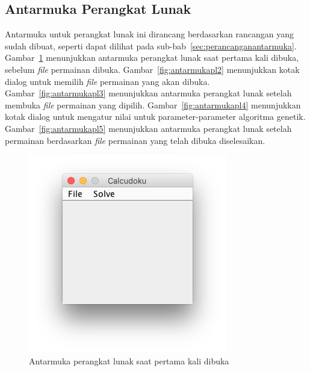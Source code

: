 \subsection{Antarmuka Perangkat Lunak}
\label{sec:antarmukapl}

Antarmuka untuk perangkat lunak ini dirancang berdasarkan rancangan yang sudah dibuat, seperti dapat dilihat pada sub-bab~\ref{sec:perancanganantarmuka}. Gambar~\ref{fig:antarmukapl1} menunjukkan antarmuka perangkat lunak saat pertama kali dibuka, sebelum \textit{file} permainan dibuka. Gambar~\ref{fig:antarmukapl2} menunjukkan kotak dialog untuk memilih \textit{file} permainan yang akan dibuka. Gambar~\ref{fig:antarmukapl3} menunjukkan antarmuka perangkat lunak setelah membuka \textit{file} permainan yang dipilih. Gambar~\ref{fig:antarmukapl4} menunjukkan kotak dialog untuk mengatur nilai untuk parameter-parameter algoritma genetik. Gambar~\ref{fig:antarmukapl5} menunjukkan antarmuka perangkat lunak setelah permainan berdasarkan \textit{file} permainan yang telah dibuka diselesaikan.

\begin{figure}
\centering
\captionsetup{justification=centering}
\includegraphics[scale=1]{Gambar/ImplementasiPengujian/Calcudoku1.png}
\caption[Antarmuka perangkat lunak saat pertama kali dibuka]{Antarmuka perangkat lunak saat pertama kali dibuka}
\label{fig:antarmukapl1}
\end{figure}

